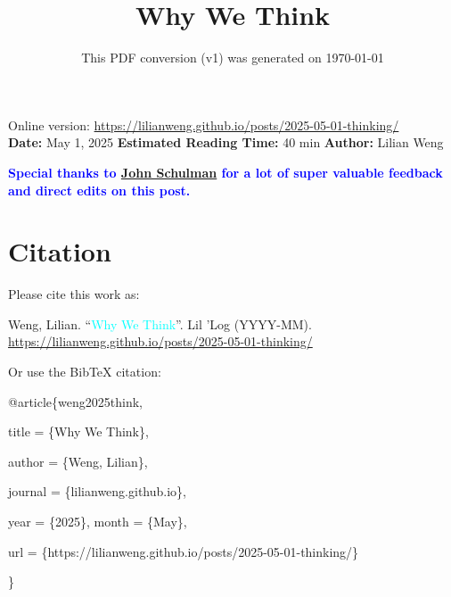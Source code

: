 \documentclass[12pt]{article}
\title{Why We Think}
\date{This PDF conversion (v1) was generated on \today\footnotemark}
\begin{document}
\maketitle
\begin{center}
    Online version: \url{https://lilianweng.github.io/posts/2025-05-01-thinking/} \\
    \textbf{Date:} May 1, 2025 \quad
    \textbf{Estimated Reading Time:} 40 min \quad
    \textbf{Author:} Lilian Weng
\end{center}

\noindent
\textcolor{blue}{\textbf{Special thanks to \href{https://twitter.com/jesse\_john\_schulman}{John Schulman} for a lot of super valuable feedback and direct edits on this post.}}

\n\n\n\section{Citation}
Please cite this work as:

\begin{tcolorbox}[colback=black!5!white, colframe=black!80!white, boxrule=0.5pt, arc=2mm, left=1mm, right=1mm, top=1mm, bottom=1mm]
Weng, Lilian. ``\textcolor{cyan}{Why We Think}''. Lil 'Log (YYYY-MM). \url{https://lilianweng.github.io/posts/2025-05-01-thinking/}
\end{tcolorbox}

Or use the BibTeX citation:

\begin{tcolorbox}[
    colback=black!5!white,
    colframe=black!80!white,
    boxrule=0.5pt,
    arc=2mm,
    left=1mm,
    right=1mm,
    top=1mm,
    bottom=1mm,
    listing only,
    listing options={
      basicstyle=\ttfamily\footnotesize,
      breaklines=true,
      literate={\{}{{\char`\{}}1 {\}}{{\char`\}}}1
    }
  ]
  @article\{weng2025think,

    title   = \{Why We Think\},

    author  = \{Weng, Lilian\},

    journal = \{lilianweng.github.io\},

    year    = \{2025\},
    month   = \{May\},

    url     = \{https://lilianweng.github.io/posts/2025-05-01-thinking/\}

  \}
  \end{tcolorbox}
\end{document}
